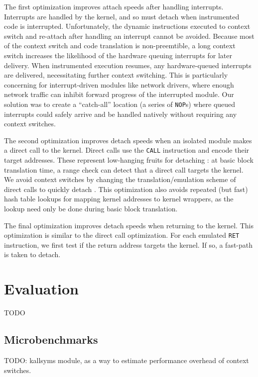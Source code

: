 \documentclass[10pt,preprint]{sigplanconf}
\begin{document}
The first optimization improves attach speeds after handling interrupts. Interrupts are handled by the kernel, and so {\sysname} must detach when instrumented code is interrupted. Unfortunately, the dynamic instructions executed to context switch and re-attach after handling an interrupt cannot be avoided. Because most of the context switch and code translation is non-preemtible, a long context switch increases the likelihood of the hardware queuing interrupts for later delivery. When instrumented execution resumes, any hardware-queued interrupts are delivered, necessitating further context switching. This is particularly concerning for interrupt-driven modules like network drivers, where enough network traffic can inhibit forward progress of the interrupted module. Our solution was to create a ``catch-all'' location (a series of \texttt{NOP}s) where queued interrupts could safely arrive and be handled natively without requiring any context switches.

The second optimization improves detach speeds when an isolated module makes a direct call to the kernel. Direct calls use the \texttt{CALL} instruction and encode their target addresses. These represent low-hanging fruits for detaching {\sysname}: at basic block translation time, a range check can detect that a direct call targets the kernel. We avoid context switches by changing the translation/emulation scheme of direct calls to quickly detach {\sysname}. This optimization also avoids repeated (but fast) hash table lookups for mapping kernel addresses to kernel wrappers, as the lookup need only be done during basic block translation.

The final optimization improves detach speeds when returning to the kernel. This optimization is similar to the direct call optimization. For each emulated \texttt{RET} instruction, we first test if the return address targets the kernel. If so, a fast-path is taken to detach.


\section{Evaluation}
TODO

\subsection{Microbenchmarks}
TODO: kallsyms module, as a way to estimate performance overhead of context switches.
\end{document}
